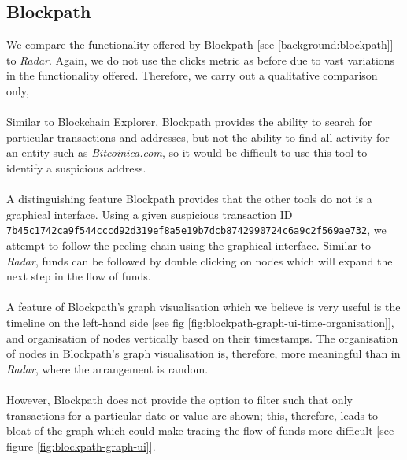 \subsection{Blockpath}
We compare the functionality offered by Blockpath [see \ref{background:blockpath}] to \textit{Radar}. Again, we do not use the clicks metric as before due to vast variations in the functionality offered. Therefore, we carry out a qualitative comparison only,
\\\\
Similar to Blockchain Explorer, Blockpath provides the ability to search for particular transactions and addresses, but not the ability to find all activity for an entity such as \textit{Bitcoinica.com}, so it would be difficult to use this tool to identify a suspicious address. 
\\\\
A distinguishing feature Blockpath provides that the other tools do not is a graphical interface. Using a given suspicious transaction ID \\\texttt{7b45c1742ca9f544cccd92d319ef8a5e19b7dcb8742990724c6a9c2f569ae732}, we attempt to follow the peeling chain using the graphical interface. Similar to \textit{Radar}, funds can be followed by double clicking on nodes which will expand the next step in the flow of funds.
\\\\
A feature of Blockpath's graph visualisation which we believe is very useful is the timeline on the left-hand side [see fig \ref{fig:blockpath-graph-ui-time-organisation}], and organisation of nodes vertically based on their timestamps. The organisation of nodes in Blockpath's graph visualisation is, therefore, more meaningful than in \textit{Radar}, where the arrangement is random. 
\\\\
However, Blockpath does not provide the option to filter such that only transactions for a particular date or value are shown; this, therefore, leads to bloat of the graph which could make tracing the flow of funds more difficult [see figure \ref{fig:blockpath-graph-ui}]. 

